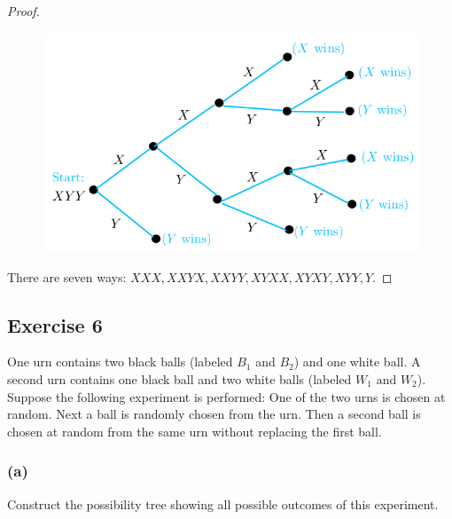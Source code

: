 \documentclass[14pt]{extarticle}
\begin{document}
\begin{proof}
\begin{figure}[ht!]
\centering
\includegraphics[scale=0.4]{../images/9.2.5.png}
\end{figure}

There are seven ways: \(XXX, XXYX, XXYY, XYXX, XYXY, XYY, Y\).
\end{proof}

\subsection{Exercise 6}
One urn contains two black balls (labeled \(B_1\) and \(B_2\)) and one white ball. A second urn contains one black 
ball and two white balls (labeled \(W_1\) and \(W_2\)). Suppose the following experiment is performed: One of the 
two urns is chosen at random. Next a ball is randomly chosen from the urn. Then a second ball is chosen at random 
from the same urn without replacing the first ball.

\subsubsection{(a)}
Construct the possibility tree showing all possible outcomes of this experiment.
\end{document}
